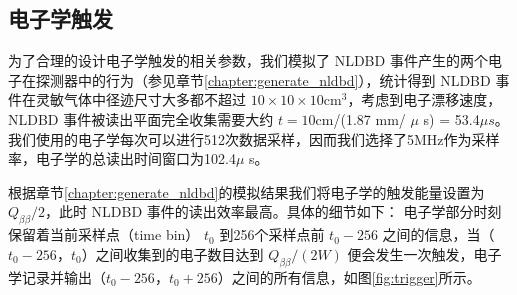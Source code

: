 \subsection{电子学触发}
为了合理的设计电子学触发的相关参数，我们模拟了 NLDBD 事件产生的两个电子在探测器中的行为（参见章节\ref{chapter:generate_nldbd}），统计得到 NLDBD 事件在灵敏气体中径迹尺寸大多都不超过 $10\times10\times10$cm$^3$，考虑到电子漂移速度，NLDBD 事件被读出平面完全收集需要大约 $t=10$cm/(1.87 mm/ $\mu$ s) = 53.4$\mu s$。我们使用的电子学每次可以进行512次数据采样，因而我们选择了5MHz作为采样率，电子学的总读出时间窗口为102.4$\mu$ s。

根据章节\ref{chapter:generate_nldbd}的模拟结果我们将电子学的触发能量设置为 $Q_{\beta\beta}/2$，此时 NLDBD 事件的读出效率最高。具体的细节如下： 电子学部分时刻保留着当前采样点（time bin） $t_0$ 到256个采样点前 $t_0-256$ 之间的信息，当（$t_0-256$，$t_0$）之间收集到的电子数目达到 $Q_{\beta\beta}/ (2W)$ 便会发生一次触发，电子学记录并输出（$t_0-256$，$t_0+256$）之间的所有信息，如图\ref{fig:trigger}所示。

